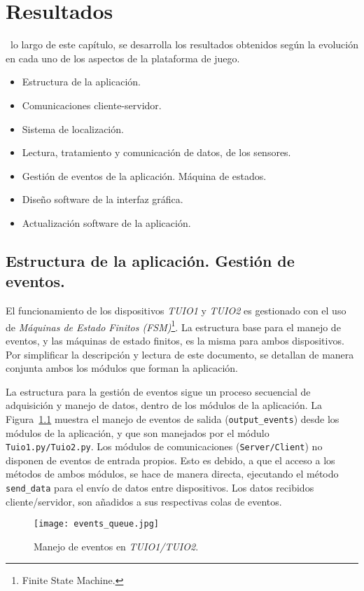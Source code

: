 \chapter{Resultados}
\label{chap:resultados}


 ~lo largo de este capítulo, se desarrolla los resultados obtenidos según la evolución en cada uno de los aspectos de la plataforma de juego.
\begin{itemize}
\item Estructura de la aplicación.
\item Comunicaciones cliente-servidor.
\item Sistema de localización.
\item Lectura, tratamiento y comunicación de datos, de los sensores.
\item Gestión de eventos de la aplicación. Máquina de estados.
\item Diseño software de la interfaz gráfica.
\item Actualización software de la aplicación.
\end{itemize}


\section{Estructura de la aplicación. Gestión de eventos.}
El funcionamiento de los dispositivos \emph{TUIO1} y \emph{TUIO2} es gestionado con el uso de \emph{Máquinas de Estado Finitos (FSM)}\footnote{Finite State Machine.}.
La estructura base para el manejo de eventos, y las máquinas de estado finitos, es la misma para ambos dispositivos. Por simplificar la descripción y lectura de este documento, se detallan de manera conjunta ambos los módulos que forman la aplicación.

La estructura para la gestión de eventos sigue un proceso secuencial de adquisición y manejo de datos, dentro de los módulos de la aplicación. La Figura~\ref{fig:eventosqueue} muestra el manejo de eventos de salida (\texttt{output\_events}) desde los módulos de la aplicación, y que son manejados por el módulo \texttt{Tuio1.py/Tuio2.py}. Los módulos de comunicaciones (\texttt{Server/Client}) no disponen de eventos de entrada propios. Esto es debido, a que el acceso a los métodos de ambos módulos, se hace de manera directa, ejecutando el método \texttt{send\_data} para el envío de datos entre dispositivos. Los datos recibidos cliente/servidor, son añadidos a sus respectivas colas de eventos.

\begin{figure}[!h]
\begin{center}
\texttt{[image: events\_queue.jpg]}
\caption{Manejo de eventos en \emph{TUIO1/TUIO2}.}
\label{fig:eventosqueue}
\end{center}
\end{figure}


